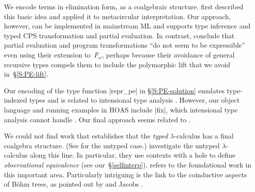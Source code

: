 We encode terms in elimination form, as a coalgebraic structure.
 first described this basic idea and applied it to
metacircular interpretation.
Our approach, however, can be implemented in mainstream ML and supports
type inference and typed CPS transformation and partial evaluation. In contrast,
\citeauthor{Pfenning-Lee} conclude that partial evaluation and program
transformations ``do not seem to be expressible'' even using their
extension to~$F_\omega$, perhaps because their avoidance of general
recursive types compels them to include the polymorphic lift that we
avoid in~\S\ref{S:PE-lift}.
\begin{comment}
It seems that Pfenning and Lee embed $F_2$ with type constructions in 
(pure) $F_3$.  We embed $F_1$ in (weak?) $F_2$, as I see it.  In a way, what 
we do is very similar to what they do (Figure 1, p.152), except that we 
do it in standard programming languages.  It is unclear if their work can 
be implemented (yet) in any language.  And we preserve type-inference, 
while their solution needs explicit types!
The following line of their conclusion is worth citing: "... this does 
not imply that the same language is also suitable for type 
metaprogramming. ... such as partial evaluation... do not seem to be 
expressible".
I suspect you're right, but I'm still reading the paper.  See also page
146: "for a term M in $F_1$ (a simply-typed term), the representation
$\bar{M}$ will be in $F_2$".  The move from $F_2$ to $F_3$ 
and beyond reminds me
strongly of our attempts at self-interpretation without the notion of a
syntactic hole.
\end{comment}

Our encoding of the type function |repr_pe| in \S\ref{S:PE-solution}
emulates type-indexed types and is related to intensional type analysis
\cite{Morrisett-intensional,Generic-Haskell}. However, our object
language and running examples in HOAS include |fix|,
which intensional type analysis cannot handle
\cite{xi-guarded}.  Our final approach
seems related to \citet{Washburn-Weirich-boxes}.


We could not find work that establishes that
the \emph{typed} $\lambda$-calculus has a final coalgebra structure.
\ifshort
(See  for the untyped case.)
\else
{}
investigate the untyped $\lambda$-calculus
along this line.  
In particular, they use
contexts with a hole \cite[p.\,13]{honsell99coinductive} to define
\emph{observational equivalence}
(see our~\S\ref{selfinterp}).
 refers to the
foundational work in this important area.  
Particularly intriguing is the link to the
coinductive aspects of B\"{o}hm trees, as pointed out by
\citet{berarducci-models} and Jacobs \citeyearpar[Example 4.3.4]{jacobs-coalgebra}.
\fi


